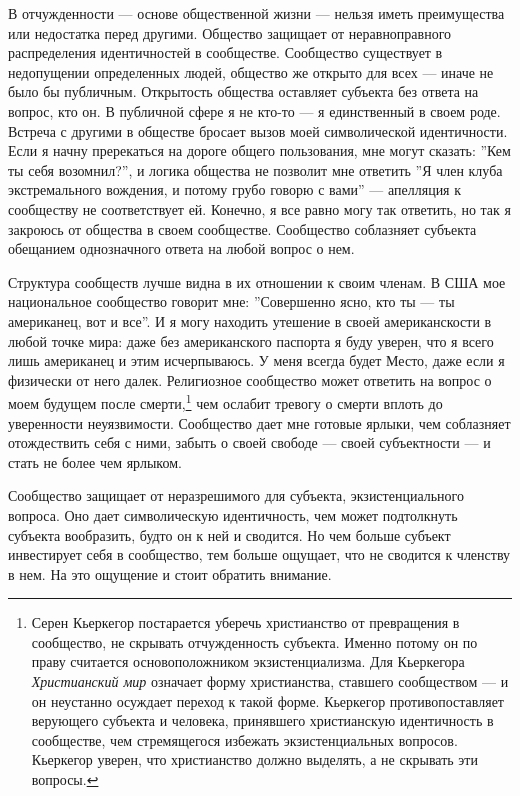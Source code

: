 \documentclass[12pt]{book}
\begin{document}
В отчужденности --- основе общественной жизни --- нельзя иметь преимущества или недостатка перед другими. Общество защищает от неравноправного распределения идентичностей в сообществе. Сообщество существует в недопущении определенных людей, общество же открыто для всех --- иначе не было бы публичным. Открытость общества оставляет субъекта без ответа на вопрос, кто он. В публичной сфере я не кто-то --- я единственный в своем роде. Встреча с другими в обществе бросает вызов моей символической идентичности. Если я начну пререкаться на дороге общего пользования, мне могут сказать: ''Кем ты себя возомнил?'', и логика общества не позволит мне ответить ''Я член клуба экстремального вождения, и потому грубо говорю с вами'' --- апелляция к сообществу не соответствует ей. Конечно, я все равно могу так ответить, но так я закроюсь от общества в своем сообществе. Сообщество соблазняет субъекта обещанием однозначного ответа на любой вопрос о нем.

Структура сообществ лучше видна в их отношении к своим членам. В США мое национальное сообщество говорит мне: ''Совершенно ясно, кто ты --- ты американец, вот и все''. И я могу находить утешение в своей американскости в любой точке мира: даже без американского паспорта я буду уверен, что я всего лишь американец и этим исчерпываюсь. У меня всегда будет Место, даже если я физически от него далек. Религиозное сообщество может ответить на вопрос о моем будущем после смерти,\footnote{Серен Кьеркегор постарается уберечь христианство от превращения в сообщество, не скрывать отчужденность субъекта. Именно потому он по праву считается основоположником экзистенциализма. Для Кьеркегора \textit{Христианский мир} означает форму христианства, ставшего сообществом --- и он неустанно осуждает переход к такой форме. Кьеркегор противопоставляет верующего субъекта и человека, принявшего христианскую идентичность в сообществе, чем стремящегося избежать экзистенциальных вопросов. Кьеркегор уверен, что христианство должно выделять, а не скрывать эти вопросы.} чем ослабит тревогу о смерти вплоть до уверенности неуязвимости. Сообщество дает мне готовые ярлыки, чем соблазняет отождествить себя с ними, забыть о своей свободе --- своей субъектности --- и стать не более чем ярлыком.

Сообщество защищает от неразрешимого для субъекта, экзистенциального вопроса. Оно дает символическую идентичность, чем может подтолкнуть субъекта вообразить, будто он к ней и сводится. Но чем больше субъект инвестирует себя в сообщество, тем больше ощущает, что не сводится к членству в нем. На это ощущение и стоит обратить внимание.
\end{document}

